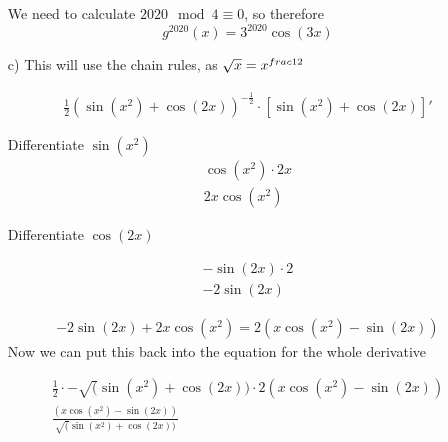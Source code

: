 \documentclass[11pt]{article}
\begin{document}
\begin{enumerate}
        We need to calculate $2020 \mod{4} \equiv 0$, so therefore
        \[
          g^{2020}(x) = 3^{2020}\cos(3x)
        \]
  \item[c)]
        This will use the chain rules, as $\sqrt{x} = x^{\\frac{1}{2}}$


\begin{gather*}
\frac{1}{2}\left(\sin(x^{2})+\cos(2x)\right)^{-\frac{1}{2}} \cdot \left[\sin(x^{2})+\cos(2x)\right]'
\end{gather*}

        Differentiate $\sin(x^{2})$
\begin{gather*}
  \cos(x^{2}) \cdot 2x \\
  2x \cos(x^{2})
\end{gather*}

        Differentiate $\cos(2x)$

\begin{gather*}
  -\sin(2x) \cdot 2 \\
  -2\sin(2x)
\end{gather*}

        \begin{gather*}
-2\sin(2x) + 2x \cos(x^{2}) = 2(x\cos(x^{2})-\sin(2x))
\end{gather*}
        Now we can put this back into the equation for the whole derivative

\begin{gather*}
  \frac{1}{2} \cdot -\sqrt(\sin(x^{2})+\cos(2x)) \cdot 2(x\cos(x^{2})-\sin(2x)) \\
  \frac{(x\cos(x^{2})-\sin(2x))}{\sqrt(\sin(x^{2})+\cos(2x))} \\
\end{gather*}

\end{enumerate}
\end{document}

